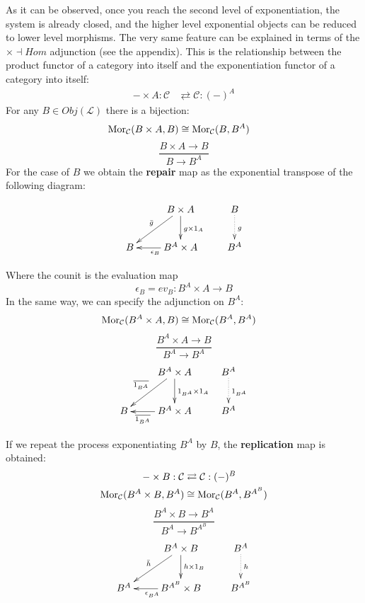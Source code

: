 \documentclass[aps,twocolumn]{revtex4-1}
\begin{document}
As it can be observed, once you reach the second level of exponentiation, the system is already closed, and the higher level exponential objects can be reduced to lower level morphisms. The very same feature can be explained in terms of the $\times \dashv Hom$ adjunction (see the appendix). This is the relationship between the product functor of a category into itself and the exponentiation functor of a category into itself:
\begin{align*}
- \times A: \mathcal{C} & \rightleftarrows \mathcal{C}: (-)^A
\end{align*}
For any $B \in Obj(\mathcal{L})$ there is a bijection:
\begin{align*}
\mathop{\rm Mor}\nolimits_{\mathcal{C}}(B \times A, B) & \cong  \mathop{\rm Mor}\nolimits_{\mathcal{C}}(B, B^A)
\end{align*}
		$$
			\frac{B \times A \longrightarrow B}{B \longrightarrow B^A}
		$$
For the case of $B$ we obtain the \textbf{repair} map as the exponential transpose of the following diagram:

			$$
			\xymatrix{
			& B \times A \ar[d]^{g \times 1_A} \ar[dl]_{\bar{g}} & B \ar@{.>}[d]^{g}\\
			B & B^A \times A \ar[l]^{\epsilon_B} & B^A}
			$$
	
Where the counit is the evaluation map
		$$
			\epsilon_B = ev_B \colon B^A \times A \longrightarrow B
		$$
In the same way, we can specify the adjunction on $B^A$:
\begin{align*}
\mathop{\rm Mor}\nolimits_{\mathcal{C}}(B^A \times A, B) & \cong  \mathop{\rm Mor}\nolimits_{\mathcal{C}}(B^A, B^{A})
\end{align*}
	$$
			\frac{B^A \times A \longrightarrow B}{B^A \longrightarrow B^{A}}
		$$
				$$
			\xymatrix{
			& B^A \times A \ar[d]^{1_{B^A} \times 1_A} \ar[dl]_{\overline{1_{B^A}}} & B^A \ar@{.>}[d]^{1_{B^A}}\\
			B & B^A \times A \ar[l]^-{\overline{1_{B^A}}} & B^A}
			$$

If we repeat the process exponentiating $B^A$ by $B$, the \textbf{replication} map is obtained:	
\begin{align*}
- \times B: \mathcal{C} & \rightleftarrows \mathcal{C}: (-)^B\\
\mathop{\rm Mor}\nolimits_{\mathcal{C}}(B^A \times B, B^A) & \cong  \mathop{\rm Mor}\nolimits_{\mathcal{C}}(B^A, B^{A^B})
\end{align*}
	$$
			\frac{B^A \times B \longrightarrow B^A}{B^A \longrightarrow B^{A^B}}
		$$
			$$ \xymatrix{
			& B^A \times B \ar[d]^-{h \times 1_B} \ar[dl]_{\bar{h}} & B^A \ar@{.>}[d]^-{h}\\
			B^A & B^{A^B} \times B \ar[l]^{\epsilon_{B^A}} & B^{A^B}}
			$$
		
\end{document}
